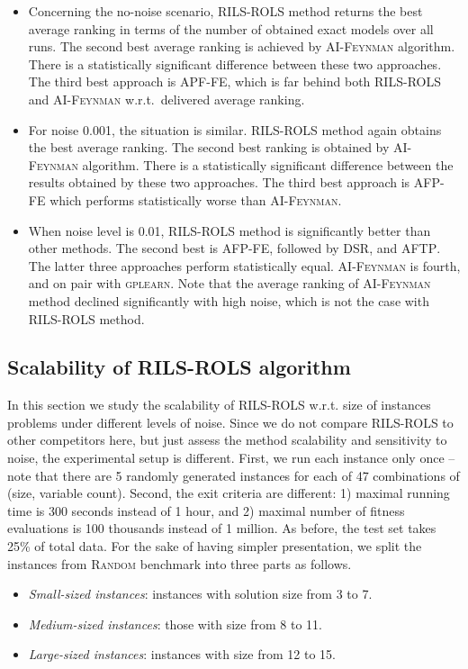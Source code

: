 \documentclass{bmcart}
\begin{document}
\begin{itemize}
	\item  Concerning the no-noise scenario, \textsc{RILS}-\textsc{ROLS} method returns the best average ranking in terms of the number of obtained exact models over all runs.  The second best average ranking is achieved by \textsc{AI-Feynman} algorithm. There is a statistically significant difference between these two approaches. The third best approach is \textsc{APF-FE},  which is far behind both \textsc{RILS}-\textsc{ROLS} and \textsc{AI-Feynman} w.r.t.\ delivered average ranking.  
	\item  For noise 0.001, the situation is similar. \textsc{RILS}-\textsc{ROLS} method again obtains the best average ranking. The second best ranking is obtained by \textsc{AI-Feynman} algorithm. There is a statistically significant difference between the results obtained by these two approaches. The third best approach is \textsc{AFP-FE} which performs statistically worse than \textsc{AI-Feynman}.  
	\item  When noise level is 0.01, \textsc{RILS-ROLS} method is significantly better than other methods. The second best is \textsc{AFP-FE}, followed by \textsc{DSR}, and \textsc{AFTP}. The latter three approaches perform statistically equal. \textsc{AI-Feynman} is fourth, and on pair with \textsc{gplearn}. Note that the average ranking of \textsc{AI-Feynman} method declined significantly with high noise, which is not the case with \textsc{RILS}-\textsc{ROLS} method.   
	
\end{itemize}

\subsection{Scalability of \textsc{RILS}-\textsc{ROLS} algorithm}\label{sec:scalability-rils-rols}

In this section we study the scalability of \textsc{RILS-ROLS} w.r.t. size of instances problems under different levels of noise.
Since we do not compare \textsc{RILS-ROLS} to other competitors here, but just assess the method scalability and sensitivity to noise, the experimental setup is different. First, we run each instance only once -- note that there are 5 randomly generated instances for each of 47 combinations of (size, variable count). Second, the exit criteria are different: 1) maximal running time is 300 seconds instead of 1 hour, and 2) maximal number of fitness evaluations is 100 thousands instead of 1 million. 
As before, the test set takes 25\% of total data. 
For the sake of having simpler presentation, we split the instances from \textsc{Random} benchmark into three parts as follows. 
\begin{itemize}
	\item \textit{Small-sized instances}: instances with solution size from 3 to 7.
	\item \textit{Medium-sized instances}: those with size from 8 to 11.
	\item \textit{Large-sized instances}: instances with size from 12 to 15. 
\end{itemize}
\end{document}
